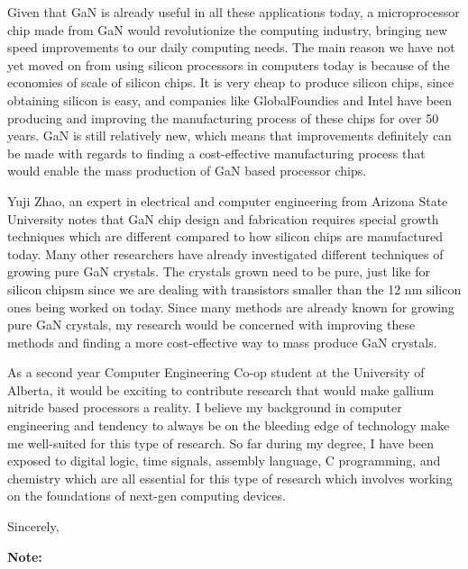 \documentclass[letterpaper]{letter}
\begin{document}
\begin{letter}
Given that GaN is already useful in all these applications today, a
microprocessor chip made from GaN would revolutionize the computing industry,
bringing new speed improvements to our daily computing needs. The main reason
we have not yet moved on from using silicon processors in computers today is
because of the economies of scale of silicon chips. It is very cheap to produce
silicon chips, since obtaining silicon is easy, and companies like
GlobalFoundies and Intel have been producing and improving the manufacturing
process of these chips for over 50 years. GaN is still relatively new,
which means that improvements definitely can be made with regards to finding a
cost-effective manufacturing process that would enable the mass production of GaN
based processor chips.


Yuji Zhao, an expert in electrical and computer engineering from Arizona State
University %
notes that GaN chip design and fabrication requires special growth techniques
which are different compared to how silicon chips are manufactured today. Many
other researchers have already investigated different techniques of growing pure
GaN crystals. The crystals grown need to be pure, just like for silicon chipsm
since we are dealing with transistors smaller than the 12 nm silicon ones being
worked on today. Since many methods are already known for growing pure GaN
crystals, my research would be concerned with improving these methods and
finding a more cost-effective way to mass produce GaN crystals.


As a second year Computer Engineering Co-op student at the University of
Alberta, it would be exciting to contribute research that would make gallium
nitride based processors a reality. I believe my background in computer
engineering and tendency to always be on the bleeding edge of technology make me
well-suited for this type of research. So far during my degree, I have been
exposed to digital logic, time signals, assembly language, C programming, and
chemistry which are all essential for this type of research which involves
working on the foundations of next-gen computing devices.

\closing{Sincerely,}

\end{letter}
\newpage
\textbf{Note:}
\end{document}

